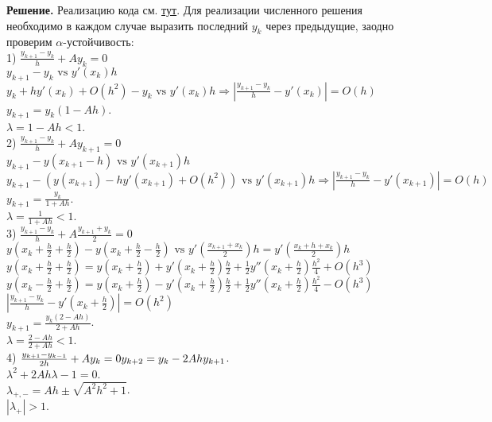 \documentclass[14pt,a4paper]{extarticle}
\newcommand{\1}{\mathbbm{1}}
\begin{document}
\textbf{Решение.} 
Реализацию кода см. \href{https://github.com/VsevolodZaostrovsky/NumericalMethods/tree/main/Differential%20Equations/Code/src}{тут}. 
Для реализации численного решения необходимо в каждом случае выразить последний $y_k$ через предыдущие, заодно проверим 
$\alpha$-устойчивость: \\
1) $\frac{y_{k+1}-y_k}{h}+A y_k=0 $\\ 
$y_{k+1}-y_k \text{ vs } y'(x_k) h $\\ 
$y_{k} + h y'(x_k) + O(h^2) - y_k \text{ vs } y'(x_k) h \Rightarrow {|\frac{y_{k+1}-y_k}{h} - y'(x_k)| = O(h)}$ \\ 
$y_{k+1} = y_k (1 - Ah)$. \\
$\lambda = 1 - A h < 1$. \\
2) $\frac{y_{k+1}-y_k}{h}+A y_{k+1}=0$ \\ 
$y_{k+1}-y(x_{k+1} - h) \text{ vs } y'(x_{k+1}) h $\\ 
$y_{k+1} -( y(x_{k+1}) - h y'(x_{k+1}) + O(h^2)) \text{ vs } y'(x_{k+1}) h \Rightarrow {|\frac{y_{k+1}-y_k}{h} - y'(x_{k+1})| = O(h)}$ \\ 
$y_{k+1} = \frac{y_k}{1 + Ah} $.\\
$\lambda = \frac{1}{1 + Ah} < 1$. \\
3) $\frac{y_{k+1}-y_k}{h}+A \frac{y_{k+1}+y_k}{2}=0 $\\ 
$y(x_k + \frac{h}{2} + \frac{h}{2}) - y(x_k + \frac{h}{2} - \frac{h}{2}) \text{ vs } y'(\frac{x_{k+1} + x_k}{2}) h = y'(\frac{x_{k} + h + x_k}{2}) h$\\ 
$y(x_k + \frac{h}{2} + \frac{h}{2}) = y(x_k + \frac{h}{2}) + y'(x_k + \frac{h}{2}) \frac{h}{2} + \frac{1}{2} y''(x_k + \frac{h}{2}) \frac{h^2}{4} + O(h^3)$\\
$y(x_k - \frac{h}{2} + \frac{h}{2}) = y(x_k + \frac{h}{2}) - y'(x_k + \frac{h}{2}) \frac{h}{2} + \frac{1}{2} y''(x_k + \frac{h}{2}) \frac{h^2}{4} - O(h^3)$\\ 
$|\frac{y_{k+1}-y_k}{h} - y'(x_k + \frac{h}{2})| = O(h^2)$\\ 
$y_{k+1} = \frac{y_k (2 - A h)}{2 + Ah} $. \\
$\lambda = \frac{2 - A h}{2+ A h} < 1$. \\
4) $\frac{y_{k+1}-y_{k-1}}{2 h}+A y_k=0 \\
 y_{k+2} = y_{k} - 2 A h y_{k+1} $.\\
 $\lambda^2 + 2 A h \lambda - 1 = 0$. \\
 $\lambda_{+, -} = A h \pm \sqrt{A^2 h^2 + 1}$. \\
 $|\lambda_{+}| > 1 $. \\
\end{document}
